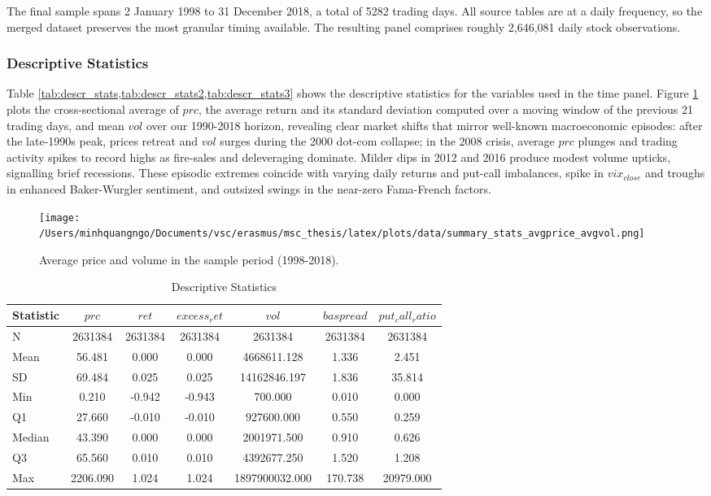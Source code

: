 The final sample spans 2 January 1998 to 31 December 2018, a total of 5282 trading days. All source tables are at a daily frequency, so the merged dataset preserves the most granular timing available. The resulting panel comprises roughly 2,646,081 daily stock observations. 

\subsubsection{Descriptive Statistics}
Table \cref{tab:descr_stats,tab:descr_stats2,tab:descr_stats3} shows the descriptive statistics for the variables used in the time panel. Figure \ref{fig:avgprice_avgvol} plots the cross-sectional average of $prc$, the average return and its standard deviation computed over a moving window of the previous 21 trading days, and mean $vol$ over our 1990-2018 horizon, revealing clear market shifts that mirror well-known macroeconomic episodes: after the late-1990s peak, prices retreat and $vol$ surges during the 2000 dot-com collapse; in the 2008 crisis, average $prc$ plunges and trading activity spikes to record highs as fire-sales and deleveraging dominate. Milder dips in 2012 and 2016 produce modest volume upticks, signalling brief recessions. These episodic extremes coincide with varying daily returns and put-call imbalances, spike in $vix_{close}$ and troughs in enhanced Baker-Wurgler sentiment, and outsized swings in the near-zero Fama-French factors. 


\begin{figure}[H]
    \centering
    \texttt{[image: /Users/minhquangngo/Documents/vsc/erasmus/msc\_thesis/latex/plots/data/summary\_stats\_avgprice\_avgvol.png]}
    \caption{Average price and volume in the sample period (1998-2018).}
    \label{fig:avgprice_avgvol}
\end{figure}

\begin{table}[ht]
\centering
\caption{Descriptive Statistics}
\label{tab:descr_stats}
\begin{tabular}{lcccccc}
\toprule
Statistic & $prc$ & $ret$ & $excess_ret$ & $vol$ & $baspread$ & $put_call_ratio$ \\\midrule
N & 2631384 & 2631384 & 2631384 & 2631384 & 2631384 & 2631384 \\
Mean & 56.481 & 0.000 & 0.000 & 4668611.128 & 1.336 & 2.451 \\
SD & 69.484 & 0.025 & 0.025 & 14162846.197 & 1.836 & 35.814 \\
Min & 0.210 & -0.942 & -0.943 & 700.000 & 0.010 & 0.000 \\
Q1 & 27.660 & -0.010 & -0.010 & 927600.000 & 0.550 & 0.259 \\
Median & 43.390 & 0.000 & 0.000 & 2001971.500 & 0.910 & 0.626 \\
Q3 & 65.560 & 0.010 & 0.010 & 4392677.250 & 1.520 & 1.208 \\
Max & 2206.090 & 1.024 & 1.024 & 1897900032.000 & 170.738 & 20979.000 \\
\bottomrule
\end{tabular}
\end{table}

